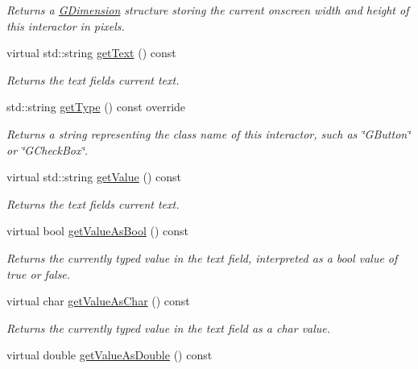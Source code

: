 \begin{DoxyCompactItemize}
\begin{DoxyCompactList}\small\item\em Returns a \mbox{\hyperlink{structsgl_1_1GDimension}{G\+Dimension}} structure storing the current onscreen width and height of this interactor in pixels. \end{DoxyCompactList}\item 
virtual std\+::string \mbox{\hyperlink{classsgl_1_1GTextField_aff553c50924b836c29f146ed34a7c6ec}{get\+Text}} () const
\begin{DoxyCompactList}\small\item\em Returns the text field\textquotesingle{}s current text. \end{DoxyCompactList}\item 
std\+::string \mbox{\hyperlink{classsgl_1_1GTextField_a9b72ede4ee8520f987a0c01e30654814}{get\+Type}} () const override
\begin{DoxyCompactList}\small\item\em Returns a string representing the class name of this interactor, such as \char`\"{}\+G\+Button\char`\"{} or \char`\"{}\+G\+Check\+Box\char`\"{}. \end{DoxyCompactList}\item 
virtual std\+::string \mbox{\hyperlink{classsgl_1_1GTextField_a2a03038d2e299f486e55dc72778f7086}{get\+Value}} () const
\begin{DoxyCompactList}\small\item\em Returns the text field\textquotesingle{}s current text. \end{DoxyCompactList}\item 
virtual bool \mbox{\hyperlink{classsgl_1_1GTextField_a8190c918ce29007223898c9d511b17ee}{get\+Value\+As\+Bool}} () const
\begin{DoxyCompactList}\small\item\em Returns the currently typed value in the text field, interpreted as a bool value of true or false. \end{DoxyCompactList}\item 
virtual char \mbox{\hyperlink{classsgl_1_1GTextField_a562f514fc055aaa37ca3145fc7abde8e}{get\+Value\+As\+Char}} () const
\begin{DoxyCompactList}\small\item\em Returns the currently typed value in the text field as a char value. \end{DoxyCompactList}\item 
virtual double \mbox{\hyperlink{classsgl_1_1GTextField_aab9a19edbd1548d557721e0b695295f8}{get\+Value\+As\+Double}} () const

\end{DoxyCompactItemize}
